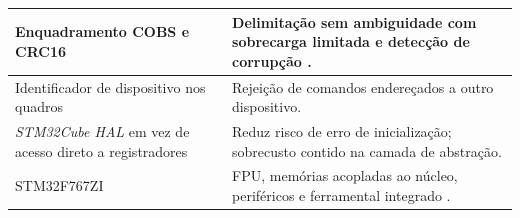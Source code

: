 \begin{quadrofixo}
\begin{tabular}{|p{4.7cm}|p{9.7cm}|}
        Enquadramento COBS e CRC16 & Delimitação sem ambiguidade com sobrecarga limitada e detecção de corrupção \cite{cheshire:1999}. \\
        \hline
        Identificador de dispositivo nos quadros & Rejeição de comandos endereçados a outro dispositivo. \\
        \hline
        \textit{STM32Cube HAL} em vez de acesso direto a registradores & Reduz risco de erro de inicialização; sobrecusto contido na camada de abstração. \\
        \hline
        STM32F767ZI & FPU, memórias acopladas ao núcleo, periféricos e ferramental integrado \cite{st:ds11532,st:um1974}. \\
        \hline
    \end{tabular}

    \label{qua:escolhas-projeto}
\end{quadrofixo}

